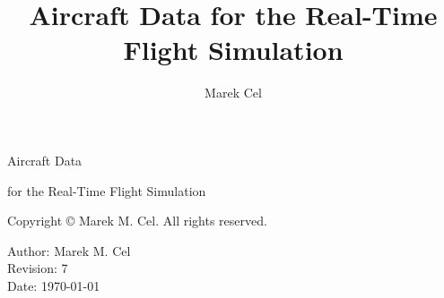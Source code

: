 \documentclass[12pt,a4paper]{report}
\title{Aircraft Data for the Real-Time Flight Simulation}
\author{Marek Cel}
\date{}
\begin{document}
  
  \begin{titlepage}
    \centering
    {\huge Aircraft Data \par for the Real-Time Flight Simulation\par}
  \end{titlepage}
  

  \noindent Copyright \copyright{} \the\year{} Marek M. Cel. All rights reserved.

  \noindent Author: Marek M. Cel \\
  Revision: 7 \\
  Date: \today

  
  
  {
    \clearpage
    \setlength{\parskip}{0em}
    \tableofcontents
  }

  
  
  
  
  
  
  
  \clearpage
   
  
  
\end{document}
